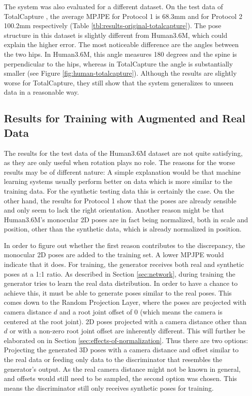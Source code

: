 The system was also evaluated for a different dataset.
On the test data of TotalCapture \cite{trumble17}, the average MPJPE for Protocol 1 is 68.3mm and for Protocol 2 100.2mm respectively (Table \ref{tbl:results-original-totalcapture}).
The pose structure in this dataset is slightly different from Human3.6M, which could explain the higher error.
The most noticeable difference are the angles between the two hips.
In Human3.6M, this angle measures 180 degrees and the spine is perpendicular to the hips, whereas in TotalCapture the angle is substantially smaller (see Figure \ref{fig:human-totalcapture}).
Although the results are slightly worse for TotalCapture, they still show that the system generalizes to unseen data in a reasonable way.




\subsection{Results for Training with Augmented and Real Data}
The results for the test data of the Human3.6M dataset are not quite satisfying, as they are only useful when rotation plays no role.
The reasons for the worse results may be of different nature:
A simple explanation would be that machine learning systems usually perform better on data which is more similar to the training data.
For the synthetic testing data this is certainly the case.
On the other hand, the results for Protocol 1 show that the poses are already sensible and only seem to lack the right orientation.
Another reason might be that Human3.6M's monocular 2D poses are in fact being normalized, both in scale and position, other than the synthetic data, which is already normalized in position.

In order to figure out whether the first reason contributes to the discrepancy, the monocular 2D poses are added to the training set.
A lower MPJPE would indicate that it does.
For training, the generator receives both real and synthetic poses at a 1:1 ratio.
As described in Section \ref{sec:network}, during training the generator tries to learn the real data distribution.
In order to have a chance to achieve this, it must be able to generate poses similar to the real poses. 
This comes down to the Random Projection Layer, where the poses are projected with camera distance $d$ and a root joint offset of $0$ (which means the camera is centered at the root joint).
2D poses projected with a camera distance other than $d$ or with a non-zero root joint offset are inherently different.
This will further be elaborated on in Section \ref{sec:effects-of-normalization}.
Thus there are two options:
Projecting the generated 3D poses with a camera distance and offset similar to the real data or feeding only data to the discriminator that resembles the generator's output.
As the real camera distance might not be known in general, and offsets would still need to be sampled, the second option was chosen.
This means the discriminator still only receives synthetic poses for training.


